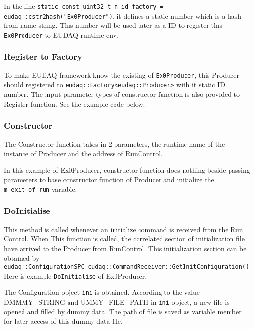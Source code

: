 

In the line \lstinline[style=cpp]{static const uint32_t m_id_factory = eudaq::cstr2hash("Ex0Producer")}, it defines a static number which is a hash from name string. This number will be used later as a ID to register this \lstinline[style=cpp]{Ex0Producer} to EUDAQ runtime env.

\subsubsection{Register to Factory}
To make EUDAQ framework know the existing of \lstinline[style=cpp]{Ex0Producer}, this Producer should registered to \lstinline[style=cpp]{eudaq::Factory<eudaq::Producer>} with it static ID number. The input parameter types of constructor function is also provided to Register function. See the example code below.


\subsubsection{Constructor}
The Constructor function takes in 2 parameters, the runtime name of the instance of Producer and the address of RunControl. 

In this example of Ex0Producer, constructor function does nothing beside passing parameters to base constructor function of Producer and initialize the \lstinline[style=cpp]{m_exit_of_run} variable.

\subsubsection{DoInitialise}
This method is called whenever an initialize command is received from the Run Control. When This function is called, the correlated section of initialization file have arrived to the Producer from RunControl. This initialization section can be obtained by \\
\lstinline[style=cpp]{eudaq::ConfigurationSPC eudaq::CommandReceiver::GetInitConfiguration()} \\

Here is example \lstinline[style=cpp]{DoInitialise} of Ex0Producer.

The Configuration object \lstinline[style=cpp]{ini} is obtained. According to the value DMMMY\_STRING and UMMY\_FILE\_PATH in \lstinline[style=cpp]{ini} object, a new file is opened and filled by dummy data. The path of file is saved as variable member for later access of this dummy data file.

